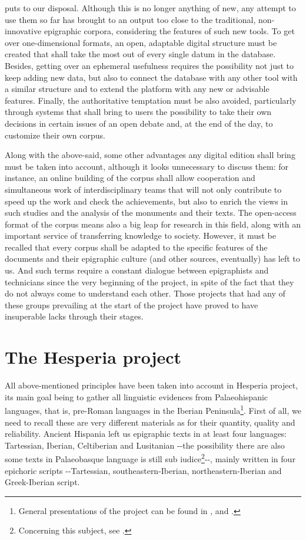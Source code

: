 \documentclass[amsthm,ebook]{saparticle}
\begin{document}
puts to our disposal. Although this is no longer anything of new, any attempt to use them so far has brought to an
output too close to the traditional, non-innovative epigraphic corpora, considering the features of such new tools. To
get over one-dimensional formats, an open, adaptable digital structure must be created that shall take the most out of
every single datum in the database. Besides, getting over an ephemeral usefulness requires the possibility not just to
keep adding new data, but also to connect the database with any other tool with a similar structure and to extend the
platform with any new or advisable features. Finally, the authoritative temptation must be also avoided, particularly
through systems that shall bring to users the possibility to take their own decisions in certain issues of an open
debate and, at the end of the day, to customize their own corpus.

Along with the above-said, some other advantages any digital edition shall bring must be taken into account, although it
looks unnecessary to discuss them: for instance, an online building of the corpus shall allow cooperation and
simultaneous work of interdisciplinary teams that will not only contribute to speed up the work and check the
achievements, but also to enrich the views in such studies and the analysis of the monuments and their texts. The
open-access format of the corpus means also a big leap for research in this field, along with an important service of
transferring knowledge to society. However, it must be recalled that every corpus shall be adapted to the specific
features of the documents and their epigraphic culture (and other sources, eventually) has left to us. And such terms
require a constant dialogue between epigraphists and technicians since the very beginning of the project, in spite of
the fact that they do not always come to understand each other. Those projects that had any of these groups prevailing
at the start of the project have proved to have insuperable lacks through their stages. 

\section{The Hesperia project}


\noindent All above-mentioned principles have been taken into account in Hesperia project, its main goal being to gather all
linguistic evidences from Palaeohispanic languages, that is, pre-Roman languages in the Iberian Peninsula\footnote{
General presentations of the project can be found in \citet{orduna_implementing_????}, \citet{orduna_philology_????} and
\citet{velaza_hesperia:_2014}.}. First of all, we need to recall these are very different materials as for their quantity, quality and
reliability. Ancient Hispania left us epigraphic texts in at least four languages: Tartessian, Iberian, Celtiberian and
Lusitanian -{}-the possibility there are also some texts in Palaeobasque language is still sub iudice\footnote{
Concerning this subject, see \citet{velaza_epigrafiy_2009}.}{}-{}-, mainly written in four epichoric scripts -{}-Tartessian,
southeastern-Iberian, northeastern-Iberian and Greek-Iberian script. 
\end{document}
